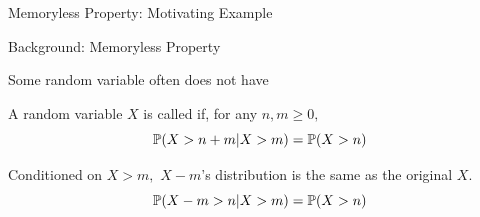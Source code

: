 \begin{frame}{Memoryless Property: Motivating Example}


\end{frame}


\begin{frame}{Background: Memoryless Property}

\plitemsep 0.2in
\bci 

\item<1-> Some random variable often does not have 

\item<2->  A random variable $X$ is called  if, for any $n,m \ge 0,$ 
$$\mathbb{P}( X > n+m | X > m ) = \mathbb{P}( X > n )$$

\item<3->  Conditioned on $X > m,$ $X-m$'s distribution is the same as the original $X.$
$$\mathbb{P}( X -m > n | X > m ) = \mathbb{P}( X > n )$$



\eci

\end{frame}








